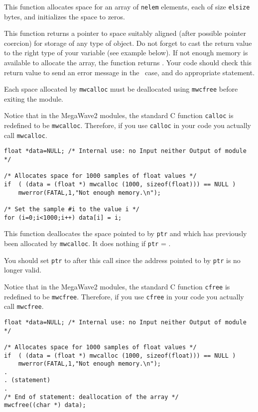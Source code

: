 \Description
This function allocates space for an array of \verb+nelem+ elements,
each of size \verb+elsize+ bytes, and initializes the space to zeros.

This function returns a pointer to space suitably aligned (after possible pointer coercion) for storage of any type of object. 
Do not forget to cast the return value to the right type of your variable
(see example below).
If not enough memory is available to allocate the array, the function returns \Null.
Your code should check this return value to send an error message in the \Null\ case, and do appropriate statement.

Each space allocated by \verb+mwcalloc+ must be deallocated using \verb+mwcfree+ before exiting the module.

Notice that in the MegaWave2 modules, the standard C function \verb+calloc+ is
redefined to be \verb+mwcalloc+. 
Therefore, if you use \verb+calloc+ in your code you actually call \verb+mwcalloc+.

\Next
\Example
\begin{verbatim}
float *data=NULL; /* Internal use: no Input neither Output of module */

/* Allocates space for 1000 samples of float values */
if  ( (data = (float *) mwcalloc (1000, sizeof(float))) == NULL )
    mwerror(FATAL,1,"Not enough memory.\n");

/* Set the sample #i to the value i */
for (i=0;i<1000;i++) data[i] = i;
\end{verbatim}

\newpage %

\Description
This function deallocates the space pointed to by 
\verb+ptr+ and which has previously been allocated by \verb+mwcalloc+. It does 
nothing if \verb+ptr+ = \Null.

You should set \verb+ptr+ to \Null after this call since the address pointed to by \verb+ptr+ is no longer valid.

Notice that in the MegaWave2 modules, the standard C function \verb+cfree+ is
redefined to be \verb+mwcfree+. 
Therefore, if you use \verb+cfree+ in your code you actually call \verb+mwcfree+.

\Next
\Example
\begin{verbatim}
float *data=NULL; /* Internal use: no Input neither Output of module */

/* Allocates space for 1000 samples of float values */
if  ( (data = (float *) mwcalloc (1000, sizeof(float))) == NULL )
    mwerror(FATAL,1,"Not enough memory.\n");
.
. (statement)
.
/* End of statement: deallocation of the array */
mwcfree((char *) data);
\end{verbatim}

